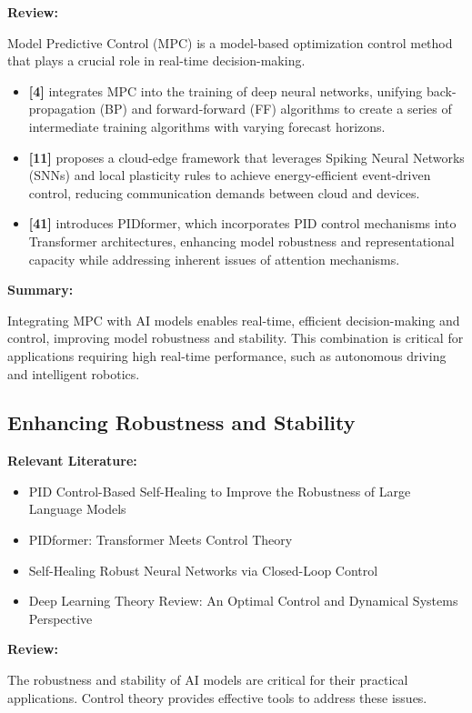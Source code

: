 \documentclass{article}
\theoremstyle{plain}
\theoremstyle{definition}
\theoremstyle{remark}
\begin{document}
\textbf{Review:}

Model Predictive Control (MPC) is a model-based optimization control method that plays a crucial role in real-time decision-making.

\begin{itemize}
    \item \textbf{[4]} integrates MPC into the training of deep neural networks, unifying back-propagation (BP) and forward-forward (FF) algorithms to create a series of intermediate training algorithms with varying forecast horizons.
    
    \item \textbf{[11]} proposes a cloud-edge framework that leverages Spiking Neural Networks (SNNs) and local plasticity rules to achieve energy-efficient event-driven control, reducing communication demands between cloud and devices.
    
    \item \textbf{[41]} introduces PIDformer, which incorporates PID control mechanisms into Transformer architectures, enhancing model robustness and representational capacity while addressing inherent issues of attention mechanisms.
\end{itemize}

\textbf{Summary:}

Integrating MPC with AI models enables real-time, efficient decision-making and control, improving model robustness and stability. This combination is critical for applications requiring high real-time performance, such as autonomous driving and intelligent robotics.

\subsection{Enhancing Robustness and Stability}
\textbf{Relevant Literature:}
\begin{itemize}
    \item PID Control-Based Self-Healing to Improve the Robustness of Large Language Models
    \item PIDformer: Transformer Meets Control Theory
    \item Self-Healing Robust Neural Networks via Closed-Loop Control
    \item Deep Learning Theory Review: An Optimal Control and Dynamical Systems Perspective
\end{itemize}

\textbf{Review:}

The robustness and stability of AI models are critical for their practical applications. Control theory provides effective tools to address these issues.
\end{document}
